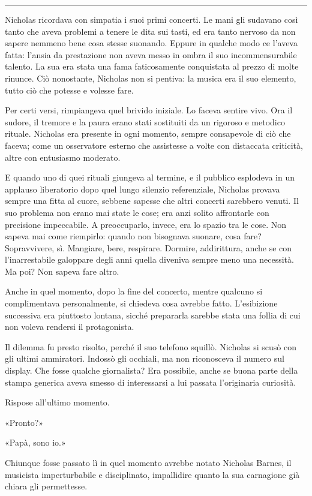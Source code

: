 \documentclass[a4paper,oneside,11pt]{memoir}
\begin{document}
\plainbreak{1}

Nicholas ricordava con simpatia i suoi primi concerti. Le mani gli sudavano così
tanto che aveva problemi a tenere le dita sui tasti, ed era tanto nervoso da non
sapere nemmeno bene cosa stesse suonando. Eppure in qualche modo ce l'aveva
fatta: l'ansia da prestazione non aveva messo in ombra il suo incommensurabile
talento. La sua era stata una fama faticosamente conquistata al prezzo di molte
rinunce. Ciò nonostante, Nicholas non si pentiva: la musica era il suo elemento,
tutto ciò che potesse e volesse fare.

Per certi versi, rimpiangeva quel brivido iniziale. Lo faceva sentire vivo. Ora
il sudore, il tremore e la paura erano stati sostituiti da un rigoroso e
metodico rituale. Nicholas era presente in ogni momento, sempre consapevole di
ciò che faceva; come un osservatore esterno che assistesse a volte con
distaccata criticità, altre con entusiasmo moderato.

E quando uno di quei rituali giungeva al termine, e il pubblico esplodeva in un
applauso liberatorio dopo quel lungo silenzio referenziale, Nicholas provava
sempre una fitta al cuore, sebbene sapesse che altri concerti sarebbero venuti.
Il suo problema non erano mai state le cose; era anzi solito affrontarle con
precisione impeccabile. A preoccuparlo, invece, era lo spazio tra le cose. Non
sapeva mai come riempirlo: quando non bisognava suonare, cosa fare?
Sopravvivere, sì. Mangiare, bere, respirare. Dormire, addirittura, anche se con
l'inarrestabile galoppare degli anni quella diveniva sempre meno una necessità.
Ma poi? Non sapeva fare altro.

Anche in quel momento, dopo la fine del concerto, mentre qualcuno si
complimentava personalmente, si chiedeva cosa avrebbe fatto. L'esibizione
successiva era piuttosto lontana, sicché prepararla sarebbe stata una follia di
cui non voleva rendersi il protagonista.

Il dilemma fu presto risolto, perché il suo telefono squillò. Nicholas si scusò
con gli ultimi ammiratori. Indossò gli occhiali, ma non riconosceva il numero
sul display. Che fosse qualche giornalista? Era possibile, anche se buona parte
della stampa generica aveva smesso di interessarsi a lui passata l'originaria
curiosità.

Rispose all'ultimo momento.

«Pronto?»

«Papà, sono io.»

Chiunque fosse passato lì in quel momento avrebbe notato Nicholas Barnes, il
musicista imperturbabile e disciplinato, impallidire quanto la sua carnagione
già chiara gli permettesse.
\end{document}
